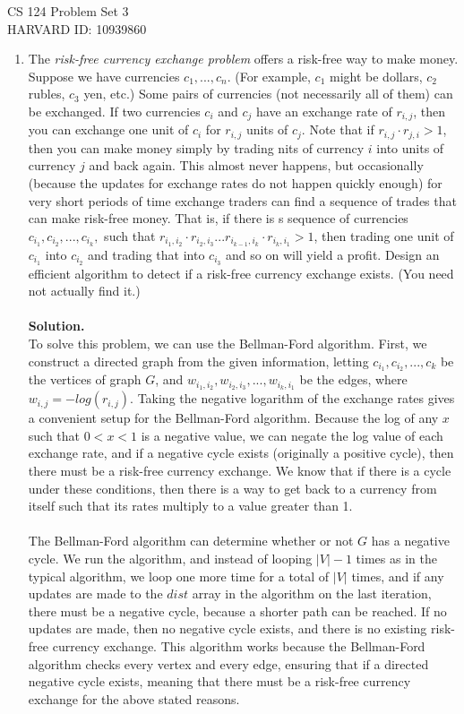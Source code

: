 \documentclass[11pt]{article}
\newcommand\solution{%
  \textbf{Solution.}\\%
}
\begin{document}
CS 124 Problem Set 3 \\
\indent HARVARD ID: 10939860

\begin{enumerate}

\item
The \textit{risk-free currency exchange problem} offers a risk-free way to make money. Suppose we have currencies $c_1, ... , c_n$. (For example, $c_1$ might be dollars, $c_2$ rubles, $c_3$ yen, etc.) Some pairs of currencies (not necessarily all of them) can be exchanged. If two currencies $c_i$ and $c_j$ have an exchange rate of $r_{i, j}$, then you can exchange one unit of $c_i$ for $r_{i,j}$ units of $c_j$. Note that if $r_{i, j} \cdot r_{j, i} > 1$, then you can make money simply by trading nits of currency $i$ into units of currency $j$ and back again. This almost never happens, but occasionally (because the updates for exchange rates do not happen quickly enough) for very short periods of time exchange traders can find a sequence of trades that can make risk-free money. That is, if there is s sequence of currencies $c_{i_1}, c_{i_2}, ... , c_{i_k},$ such that $r_{i_1, i_2} \cdot r_{i_2, i_3} ... r_{i_{k-1}, i_k} \cdot r_{i_k, i_1}  > 1$, then trading one unit of $c_{i_1}$ into $c_{i_2}$ and trading that into $c_{i_3}$ and so on will yield a profit. 
\medskip
Design an efficient algorithm to detect if a risk-free currency exchange exists. (You need not actually find it.)
 \\\\
\solution
To solve this problem, we can use the Bellman-Ford algorithm. First, we construct a directed graph from the given information, letting $c_{i_{1}}, c_{i_{2}}, ..., c_k$ be the vertices of graph $G$, and $w_{i_1,i_2}, w_{i_2,i_3}, ..., w_{i_k, i_1}$ be the edges, where $w_{i,j} = -log(r_{i,j})$. Taking the negative logarithm of the exchange rates gives a convenient setup for the Bellman-Ford algorithm. Because the log of any $x$ such that $0 < x < 1$ is a negative value, we can negate the log value of each exchange rate, and if a negative cycle exists (originally a positive cycle), then there must be a risk-free currency exchange. We know that if there is a cycle under these conditions, then there is a way to get back to a currency from itself such that its rates multiply to a value greater than 1. \\
\\
The Bellman-Ford algorithm can determine whether or not $G$ has a negative cycle. We run the algorithm, and instead of looping $|V|-1$ times as in the typical algorithm, we loop one more time for a total of $|V|$ times, and if any updates are made to the $dist$ array in the algorithm on the last iteration, there must be a negative cycle, because a shorter path can be reached. If no updates are made, then no negative cycle exists, and there is no existing risk-free currency exchange. This algorithm works because the Bellman-Ford algorithm checks every vertex and every edge, ensuring that if a directed negative cycle exists, meaning that there must be a risk-free currency exchange for the above stated reasons. \\

\end{enumerate}
\end{document}
